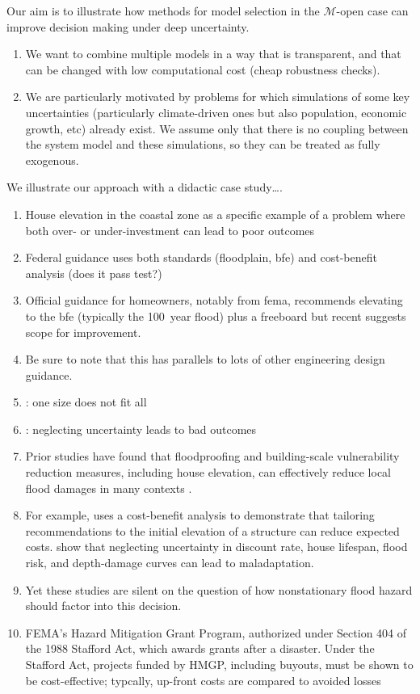 \documentclass[11pt]{article}
\begin{document}
Our aim is to illustrate how methods for model selection in the $\mathcal{M}$-open case can improve decision making under deep uncertainty.
\begin{enumerate}
    \item We want to combine multiple models in a way that is transparent, and that can be changed with low computational cost (cheap robustness checks).
    \item We are particularly motivated by problems for which simulations of some key uncertainties (particularly climate-driven ones but also population, economic growth, etc) already exist. We assume only that there is no coupling between the system model and these simulations, so they can be treated as fully exogenous.
\end{enumerate}
We illustrate our approach with a didactic case study\ldots.
\begin{enumerate}
    \item House elevation in the coastal zone as a specific example of a problem where both over- or under-investment can lead to poor outcomes
    \item Federal guidance uses both standards (floodplain, \gls{bfe}) and cost-benefit analysis (does it pass test?)
    \item Official guidance for homeowners, notably from \gls{fema}, recommends elevating to the \gls{bfe} (typically the \SI{100}{year} flood) plus a freeboard \citep{fema_retrofitting:2014,asce_24-14:2015,fema_retrofitting:2014} but recent suggests scope for improvement.
    \item Be sure to note that this has parallels to lots of other engineering design guidance.
    \item \citet{xian_elevation:2017}: one size does not fit all
    \item \citet{zarekarizi_suboptimal:2020}: neglecting uncertainty leads to bad outcomes
    \item Prior studies have found that floodproofing and building-scale vulnerability reduction measures, including house elevation, can effectively reduce local flood damages in many contexts \citep{demoel_reducing:2014,deruig_building:2020,kreibich_building:2005,slotter_floodproofing:2020,Rozer:2016dn,mobley_mitigation:2020,aerts_cost:2018}.
    \item For example, \citet{xian_elevation:2017} uses a cost-benefit analysis to demonstrate that tailoring recommendations to the initial elevation of a structure can reduce expected costs.
          \citet{zarekarizi_suboptimal:2020} show that neglecting uncertainty in discount rate, house lifespan, flood risk, and depth-damage curves can lead to maladaptation.
    \item Yet these studies are silent on the question of how nonstationary flood hazard should factor into this decision.
    \item FEMA's Hazard Mitigation Grant Program, authorized under Section 404 of the 1988 Stafford Act, which awards grants after a disaster. Under the Stafford Act, projects funded by HMGP, including buyouts, must be shown to be cost-effective; typcally, up-front costs are compared to avoided losses \citep{bendor_buyouts:2020}
\end{enumerate}
\end{document}
